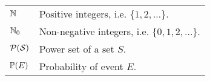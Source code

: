 	\begin{tabularx}{\textwidth}{p{3em} X}
		$\mathbb{N}$ & Positive integers, i.e. $\{1, 2, \ldots\}$.\\
		$\mathbb{N}_0$ & Non-negative integers, i.e. $\{0, 1, 2, \ldots\}$.\\
		$\cal P(S)$ & Power set of a set $S$.\\
		$\mathbb{P}(E)$ & Probability of event $E$.
	\end{tabularx}
	
	
	
	